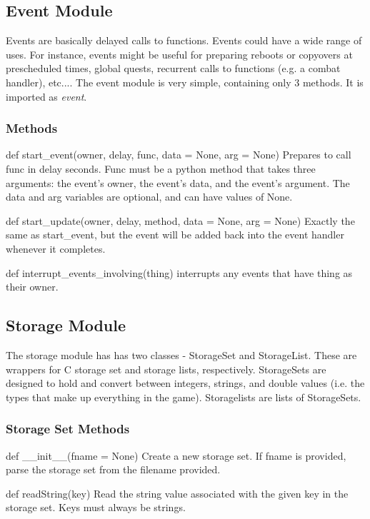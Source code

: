\documentclass[12pt]{article}
\begin{document}
\subsection{Event Module}
Events are basically delayed calls to functions. Events could have a wide range of uses. For instance, events might be useful for preparing reboots or copyovers at prescheduled times, global quests, recurrent calls to functions (e.g. a combat handler), etc.... The event module is very simple, containing only 3 methods. It is imported as {\it event}.

\subsubsection{Methods}
def start\_event(owner, delay, func, data = None, arg = None) \newline
Prepares to call func in delay seconds. Func must be a python method that takes three arguments: the event's owner, the event's data, and the event's argument. The data and arg variables are optional, and can have values of None.

def start\_update(owner, delay, method, data = None, arg = None) \newline
Exactly the same as start\_event, but the event will be added back into the event handler whenever it completes.

def interrupt\_events\_involving(thing) \newline
interrupts any events that have thing as their owner.


\subsection{Storage Module}
The storage module has has two classes - StorageSet and StorageList. These are wrappers for C storage set and storage lists, respectively. StorageSets are designed to hold and convert between integers, strings, and double values (i.e. the types that make up everything in the game). Storagelists are lists of StorageSets.

\subsubsection{Storage Set Methods}
def \_\_init\_\_(fname = None) \newline
Create a new storage set. If fname is provided, parse the storage set from the filename provided.

def readString(key) \newline
Read the string value associated with the given key in the storage set. Keys must always be strings.
\end{document}
